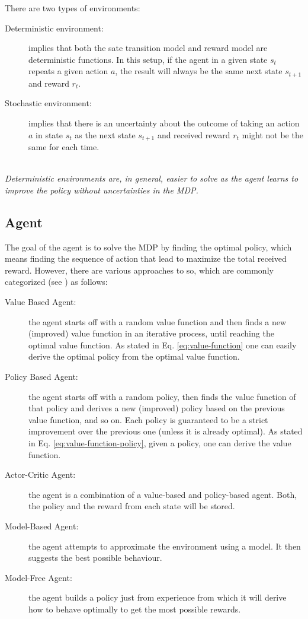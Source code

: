 There are two types of environments:
\begin{description}
    \item[Deterministic environment:] implies that both the sate transition model and reward model are deterministic functions. 
    In this setup, if the agent in a given state $s_t$ repeats a given action $a$, the result will always be the same next state $s_{t+1}$ and reward $r_t$.

    \item[Stochastic environment:] implies that there is an uncertainty about the outcome of taking an action $a$ in state $s_t$ as the next state $s_{t+1}$ and received reward $r_t$ might not be the same for each time.
\end{description}
\hfill
\\
\textit{Deterministic environments are, in general, easier to solve as the agent learns to improve the policy without uncertainties in the MDP. }

\subsection{Agent}

The goal of the agent is to solve the MDP by finding the optimal policy, which means finding the sequence of action that lead to maximize the total received reward.
However, there are various approaches to so, which are commonly categorized (see \cite{rl-demysitifed2}) as follows:
\begin{description}
    \item[Value Based Agent:] the agent starts off with a random value function and then finds a new (improved) value function in an iterative process, until reaching the optimal value function. 
    As stated in Eq. \ref{eq:value-function} one can easily derive the optimal policy from the optimal value function. 

    \item[Policy Based Agent:] the agent starts off with a random policy, then finds the value function of that policy and derives a new (improved) policy based on the previous value function, and so on. Each policy is guaranteed to be a strict improvement over the previous one (unless it is already optimal). As stated in Eq. \ref{eq:value-function-policy}, given a policy, one can derive the value function.

    \item[Actor-Critic Agent:] the agent is a combination of a value-based and policy-based agent. Both, the policy and the reward from each state will be stored.

    \item[Model-Based Agent:] the agent attempts to approximate the environment using a model. It then suggests the best possible behaviour.

    \item[Model-Free Agent:] the agent builds a policy just from experience from which it will derive how to behave optimally to get the most possible rewards.
\end{description}

